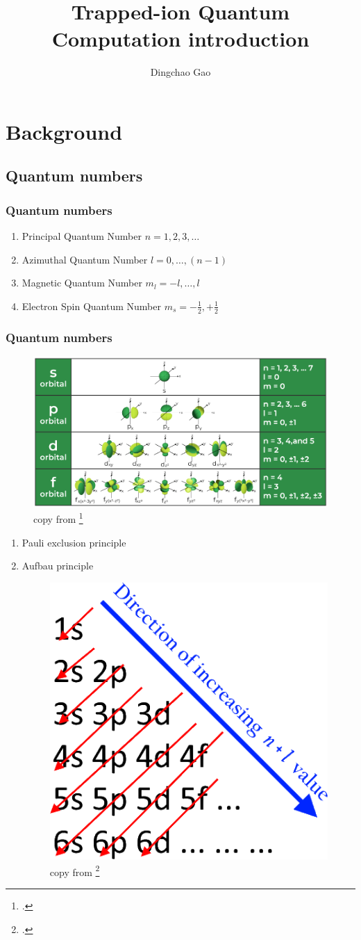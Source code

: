 \documentclass[18 pt]{beamer}
\title{Trapped-ion Quantum Computation introduction}
\author[Gcc]{Dingchao Gao}
\institute[ISCAS]{Institute of Software Chinese Academy of Sciences}
\begin{document}
\begin{frame}[plain]
  \titlepage
\end{frame}
\section{Background}
\subsection{Quantum numbers}
\begin{frame}
  \frametitle{Quantum numbers}
  \begin{enumerate}
    \item Principal Quantum Number \(n=1,2,3,\dots\)
    \item Azimuthal Quantum Number \(l=0,\dots,(n-1)\)
    \item Magnetic Quantum Number \(m_l=-l,\dots,l\)
    \item Electron Spin Quantum Number \(m_s=-\frac{1}{2},+\frac{1}{2}\)
  \end{enumerate}
\end{frame}
\begin{frame}
  \frametitle{Quantum numbers}
  \begin{figure}
    \includegraphics[width=.8\linewidth]{QuantumNumbers.png}
    \caption{copy from \footcite{https://www.geeksforgeeks.org/quantum-numbers/bibid}}
  \end{figure}
\end{frame}
\begin{frame}
  \begin{enumerate}
    \item Pauli exclusion principle
    \item Aufbau principle
    \begin{figure}
      \includegraphics[width=.3\linewidth]{Aufbau_Principle.png}
      \caption{copy from \footcite{https://en.wikipedia.org/wiki/Aufbau_principle}}
    \end{figure}
  \end{enumerate}
\end{frame}
\end{document}

